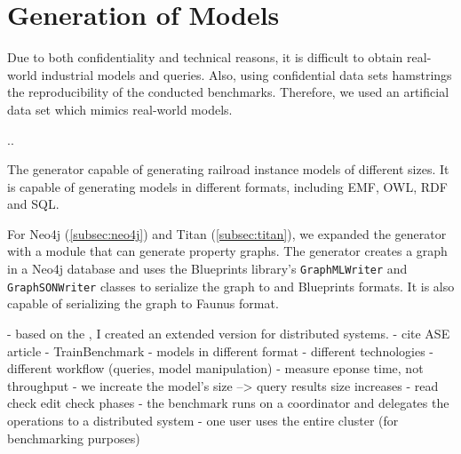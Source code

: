 \section{Generation of Models}

Due to both confidentiality and technical reasons, it is difficult to obtain real-world industrial models and queries. Also, using confidential data sets hamstrings the reproducibility of the conducted benchmarks. Therefore, we used an artificial data set which mimics real-world models.

..

The generator capable of generating railroad instance models of different sizes. It is capable of generating models in different formats, including EMF, OWL, RDF and SQL. 

For Neo4j (\autoref{subsec:neo4j}) and Titan (\autoref{subsec:titan}), we expanded the generator with a module that can generate property graphs. The generator creates a graph in a Neo4j database and uses the Blueprints library's \texttt{GraphMLWriter} and \texttt{GraphSONWriter} classes to serialize the graph to \graphml{} and Blueprints \graphson{} formats. It is also capable of serializing the graph to Faunus \graphson{} format.


- based on the \tb{}, I created an extended version for distributed systems. 
  - cite ASE article
  - TrainBenchmark
  - models in different format
  - different technologies
  - different workflow (queries, model manipulation)
  - measure eponse time, not throughput
  - we increate the model's size --> query results size increases
  - read check edit check phases
  - the benchmark runs on a coordinator and delegates the operations to a distributed system
  - one user uses the entire cluster (for benchmarking purposes)
